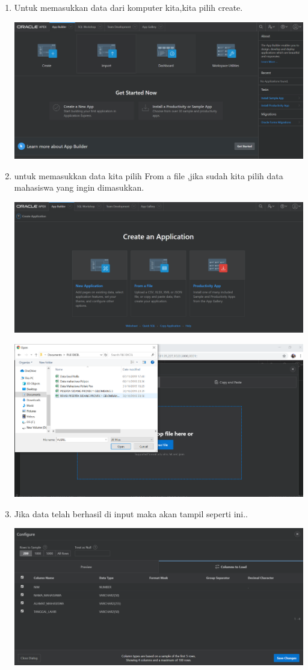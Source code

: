 \documentclass{article}
\begin{document}
\begin{enumerate}
\begin{center}
\end{center}
    \item Untuk memasukkan data dari komputer kita,kita pilih create.
    \begin{center}
    \includegraphics[width=.8\textwidth]{figure/4.PNG}
\end{center}
    \item untuk memasukkan data kita pilih From a file ,jika sudah kita pilih data mahasiswa yang ingin dimasukkan.
    \begin{center}
    \includegraphics[width=.8\textwidth]{figure/5.PNG}
\end{center}
     \begin{center}
    \includegraphics[width=.8\textwidth]{figure/18.PNG}
\end{center}
    \item Jika data telah berhasil di input maka akan tampil seperti ini..
    \begin{center}
    \includegraphics[width=.8\textwidth]{figure/20.PNG}

\end{center}
\end{enumerate}
\end{document}
